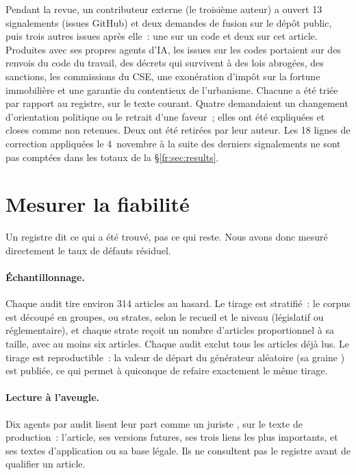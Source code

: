 \documentclass[11pt,a4paper]{article}
\begin{document}
Pendant la revue, un contributeur externe (le troisième auteur) a ouvert 13 signalements (\og issues \fg{} GitHub) et deux demandes de fusion sur le dépôt public, puis trois autres issues après elle~: une sur un code et deux sur cet article. Produites avec ses propres agents d'IA, les issues sur les codes portaient sur des renvois du code du travail, des décrets qui survivent à des lois abrogées, des sanctions, les commissions du CSE, une exonération d'impôt sur la fortune immobilière et une garantie du contentieux de l'urbanisme. Chacune a été triée par rapport au registre, sur le texte courant. Quatre demandaient un changement d'orientation politique ou le retrait d'une faveur~; elles ont été expliquées et closes comme non retenues. Deux ont été retirées par leur auteur. Les 18 lignes de correction appliquées le 4~novembre à la suite des derniers signalements ne sont pas comptées dans les totaux de la \S\ref{fr:sec:results}.

\section{Mesurer la fiabilité}
\label{fr:sec:measure}

Un registre dit ce qui a été trouvé, pas ce qui reste. Nous avons donc mesuré directement le taux de défauts résiduel.

\paragraph{Échantillonnage.}
Chaque audit tire environ 314 articles au hasard. Le tirage est stratifié~: le corpus est découpé en groupes, ou strates, selon le recueil et le niveau (législatif ou réglementaire), et chaque strate reçoit un nombre d'articles proportionnel à sa taille, avec au moins six articles. Chaque audit exclut tous les articles déjà lus. Le tirage est reproductible~: la valeur de départ du générateur aléatoire (sa \og graine \fg{}) est publiée, ce qui permet à quiconque de refaire exactement le même tirage.

\paragraph{Lecture à l'aveugle.}
Dix agents par audit lisent leur part \og comme un juriste \fg{}, sur le texte de production~: l'article, ses versions futures, ses trois liens les plus importants, et ses textes d'application ou sa base légale. Ils ne consultent pas le registre avant de qualifier un article.
\end{document}
